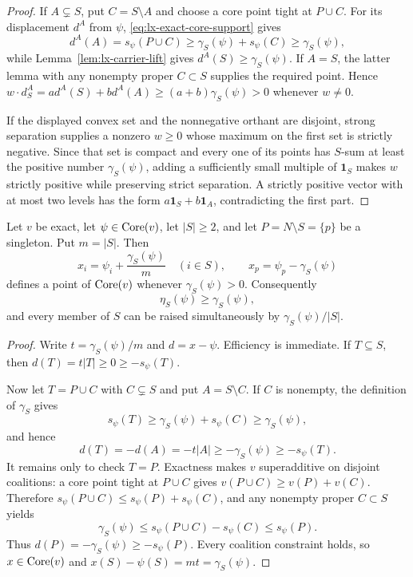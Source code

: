 \begin{proof}
If $A\subsetneq S$, put $C=S\setminus A$ and choose a core point tight at
$P\cup C$.  For its displacement $d^A$ from $\psi$,
\eqref{eq:lx-exact-core-support} gives
\[
 d^A(A)=s_\psi(P\cup C)
 \geq\gamma_S(\psi)+s_\psi(C)
 \geq\gamma_S(\psi),
\]
while Lemma~\ref{lem:lx-carrier-lift} gives
$d^A(S)\geq\gamma_S(\psi)$.  If $A=S$, the latter lemma with any nonempty
proper $C\subset S$ supplies the required point.  Hence
$w\cdot d^A_S=a d^A(S)+b d^A(A)
\geq(a+b)\gamma_S(\psi)>0$ whenever $w\ne0$.

If the displayed convex set and the nonnegative orthant are disjoint, strong
separation supplies a nonzero $w\geq0$ whose maximum on the first set is
strictly negative.  Since that set is compact and every one of its points has
$S$-sum at least the positive number $\gamma_S(\psi)$, adding a sufficiently
small multiple of $\mathbf1_S$ makes $w$ strictly positive while preserving
strict separation.  A strictly positive vector with at most two levels has
the form $a\mathbf1_S+b\mathbf1_A$, contradicting the first part.
\end{proof}

\begin{proposition}
\label{prop:lx-codimension-one-uniform-lift}
Let $v$ be exact, let $\psi\in\operatorname{Core}(v)$, let $|S|\geq2$, and let
$P=N\setminus S=\{p\}$ be a singleton.  Put $m=|S|$.  Then
\[
 x_i=\psi_i+\frac{\gamma_S(\psi)}m\quad(i\in S),
 \qquad
 x_p=\psi_p-\gamma_S(\psi)
 \tag{UL}\label{eq:lx-uniform-carrier-lift}
\]
defines a point of $\operatorname{Core}(v)$ whenever $\gamma_S(\psi)>0$.  Consequently
\[
 \eta_S(\psi)\geq\gamma_S(\psi),
\]
and every member of $S$ can be raised simultaneously by
$\gamma_S(\psi)/|S|$.
\end{proposition}

\begin{proof}
Write $t=\gamma_S(\psi)/m$ and $d=x-\psi$.  Efficiency is immediate.
If $T\subseteq S$, then $d(T)=t|T|\geq0\geq-s_\psi(T)$.

Now let $T=P\cup C$ with $C\subsetneq S$ and put $A=S\setminus C$.
If $C$ is nonempty, the definition of $\gamma_S$ gives
\[
 s_\psi(T)\geq\gamma_S(\psi)+s_\psi(C)
 \geq\gamma_S(\psi),
\]
and hence
\[
 d(T)=-d(A)=-t|A|\geq-\gamma_S(\psi)\geq-s_\psi(T).
\]
It remains only to check $T=P$.  Exactness makes $v$ superadditive on
disjoint coalitions: a core point tight at $P\cup C$ gives
$v(P\cup C)\geq v(P)+v(C)$.  Therefore
$s_\psi(P\cup C)\leq s_\psi(P)+s_\psi(C)$, and any nonempty proper
$C\subset S$ yields
\[
 \gamma_S(\psi)
 \leq s_\psi(P\cup C)-s_\psi(C)
 \leq s_\psi(P).
\]
Thus $d(P)=-\gamma_S(\psi)\geq-s_\psi(P)$.  Every coalition constraint
holds, so $x\in\operatorname{Core}(v)$ and $x(S)-\psi(S)=mt=\gamma_S(\psi)$.
\end{proof}

